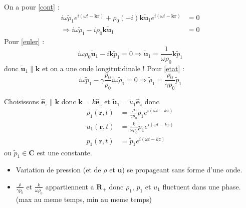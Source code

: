 On a pour \ref{cont} :
\begin{align*}
i\omega \tilde{\rho}_{1}e^{i(\omega t-\boldsymbol{kr})}+\rho_{0}(-i)\boldsymbol{k} \tilde{\boldsymbol{u}}_{1}e^{i(\omega t-\boldsymbol{kr})} & =0 \\
\Rightarrow i\omega \tilde{\rho}_{1}-i\rho _{0}\boldsymbol{k} \tilde{\boldsymbol{u}}_{1} & =0
\end{align*}
Pour \ref{euler} :
$$
i\omega \rho_{0} \tilde{\boldsymbol{u}}_{1}-i \boldsymbol{k} \tilde{p}_{1} = 0 \Rightarrow \tilde{\boldsymbol{u}}_{1}=\frac{1}{\omega \rho_{0}}\boldsymbol{k}\tilde{p}_{1}
$$
donc $\tilde{\boldsymbol{u}}_{1}\parallel \boldsymbol{k}$ et on a une onde longitutidinale ! 
Pour \ref{etat} :
$$
i\omega \tilde{p}_{1}-\gamma  \frac{p_{0}}{\rho_{0}} i\omega \tilde{\rho}_{1}=0 \Rightarrow \tilde{\rho}_{1}=\frac{\rho_{0}}{\gamma p_{0}}\tilde{p}_{1}
$$

Choisissons $\boldsymbol{\hat{e}}_{z} \parallel \boldsymbol{k}$ donc $\boldsymbol{k}=k\boldsymbol{\hat{e}}_{z}$ et $\tilde{\boldsymbol{u}}_{1}=\tilde{u}_{1}\boldsymbol{\hat{e}}_{z}$ donc
\begin{align*}
\rho_{1}(\boldsymbol{r},t) & =\frac{\rho}{\gamma p_{0}}\tilde{p}_{1}e^{i(\omega t-kz)} \\
u_{1}(\boldsymbol{r},t) & =\frac{k}{\omega \rho_{0}}\tilde{p}_{1}e^{i(\omega t-kz)} \\
p_{1}(\boldsymbol{r},t) & =\tilde{p}_{1}e^{i(\omega t-kz)}
\end{align*}
ou $\tilde{p}_{1}\in \mathbf{C}$ est une constante.

\begin{remark}
\begin{itemize}
\item Variation de pression (et de $\rho$ et $\boldsymbol{u}$) se propageant sans forme d'une onde.
\item $\frac{\rho}{\gamma p_{0}}$ et $\frac{k}{\omega \rho_{0}}$ appartiennent a $\mathbf{R}_{+}$ donc $\rho_{1}$, $p_{1}$ et $u_{1}$ fluctuent dans une phase. (max au meme temps, min au meme temps)
\end{itemize}
\end{remark}

